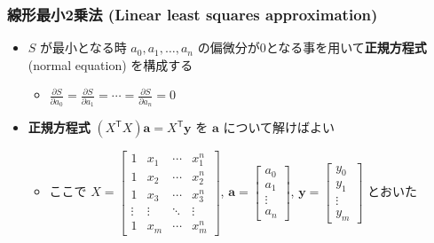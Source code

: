 \documentclass[dvipdfmx,aspectratio=169,20pt]{beamer}
\newcommand{\myfontsetting}[3]{{\fontsize{#1}{#2}\selectfont #3}}
\begin{document}
\begin{frame}
\frametitle{\Large 線形最小2乗法
\myfontsetting{15pt}{15pt}{ (Linear least squares approximation)}}
\begin{itemize}
    \setlength{\itemsep}{0.1cm}
    \item \myfontsetting{15pt}{15pt}{
    $S$ が最小となる時 $a_0,a_1,\dots, a_n$ の偏微分が0となる事を用いて{\bf 正規方程式}\myfontsetting{10pt}{10pt}{ (normal equation)} を構成する
    }
    \begin{itemize}
        \setlength{\itemsep}{0.2cm}
        \item \myfontsetting{12pt}{12pt}{
        $\displaystyle \frac{\partial S}{\partial a_0} = \frac{\partial S}{\partial a_1} = \cdots = \frac{\partial S}{\partial a_n}=0$
        }
    \end{itemize}
    \vspace{2mm}
    \item \myfontsetting{15pt}{15pt}{ {\bf 正規方程式} $(X^\mathsf{T} X) \bm{a} = X^\mathsf{T} \bm{y}$ を $\bm{a}$ について解けばよい}
    \begin{itemize}
        \vspace{2mm}
        \item
        \myfontsetting{12pt}{12pt}{ 
        ここで
        $X = \begin{bmatrix} 1 & x_1 & \cdots & x_1^n\\
        1 & x_2 & \cdots & x_2^n\\
        1 & x_3 & \cdots & x_3^n\\
        \vdots & \vdots & \ddots & \vdots\\
        1 & x_m & \cdots & x_m^n
        \end{bmatrix}$, $\bm{a} = \begin{bmatrix}
        a_0\\a_1\\ \vdots \\a_n
        \end{bmatrix}$, $\bm{y}= \begin{bmatrix}
        y_0\\y_1\\ \vdots \\y_m
        \end{bmatrix}$
        とおいた
        }
    \end{itemize}
\end{itemize}
\end{frame}
\end{document}
